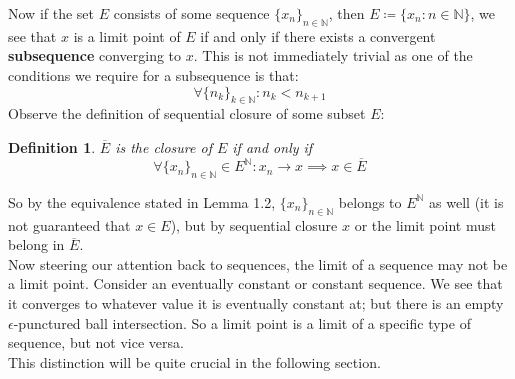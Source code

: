 \documentclass[10pt,letterpaper]{article} %
\newtheorem{defn}{Definition}[section]
\begin{document}
Now if the set $E$ consists of some sequence $\{x_n\}_{n \in \mathbb{N}}$, then $E \coloneq \{x_n : n \in \mathbb{N}\}$, we see that $x$ is a limit point of $E$ if and only if there exists a convergent \textbf{subsequence} converging to $x$. This is not immediately trivial as one of the conditions we require for a subsequence is that:
\begin{equation*}
\forall \{n_k\}_{k \in \mathbb{N}}: n_k < n_{k+1}
\end{equation*}
Observe the definition of sequential closure of some subset $E$:
\begin{defn}
$\overline{E}$ is the closure of $E$ if and only if
\begin{equation*}
\forall \{x_n\}_{n \in \mathbb{N}} \in E^\mathbb{N}: x_n \xrightarrow{} x \implies x \in \overline{E}
\end{equation*}
\end{defn}
So by the equivalence stated in Lemma 1.2, $\{x_n\}_{n \in \mathbb{N}}$ belongs to $E^\mathbb{N}$ as well (it is not guaranteed that $x \in E$), but by sequential closure $x$ or the limit point must belong in $\overline{E}$.\\

Now steering our attention back to sequences, the limit of a sequence may not be a limit point. Consider an eventually constant or constant sequence. We see that it converges to whatever value it is eventually constant at; but there is an empty $\epsilon$-punctured ball intersection. So a limit point is a limit of a specific type of sequence, but not vice versa.\\

This distinction will be quite crucial in the following section.
\end{document}
